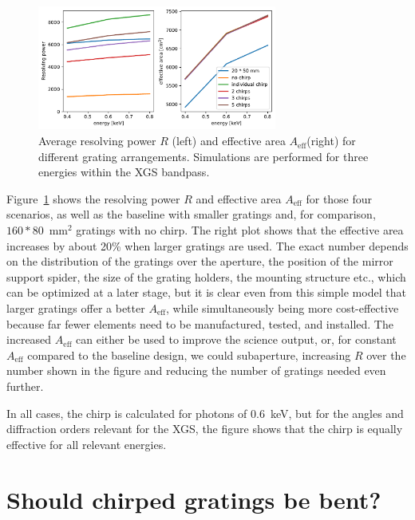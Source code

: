\documentclass[]{spie}  %
\begin{document}
\begin{figure} [ht]
\begin{center}
\includegraphics[width=0.7\textwidth]{chirp_aeff_res}
\end{center}
\caption {\label{fig:chirp_aeff_res}
Average resolving power $R$ (left) and effective area $A_{\mathrm{eff}}$(right) for different grating arrangements. Simulations are performed for three energies within the XGS bandpass. 
}
\end{figure}

Figure~\ref{fig:chirp_aeff_res} shows the resolving power $R$ and effective area $A_{\mathrm{eff}}$ for those four scenarios, as well as the baseline with smaller gratings and, for comparison, $160 * 80$~mm$^2$ gratings with no chirp. 
The right plot shows that the effective area increases by about 20\% when larger gratings are used. The exact number depends on the distribution of the gratings over the aperture, the position of the mirror support spider, the size of the grating holders, the mounting structure etc., which can be optimized at a later stage, but it is clear even from this simple model that larger gratings offer a better $A_{\mathrm{eff}}$, while simultaneously being more cost-effective because far fewer elements need to be manufactured, tested, and installed. The increased $A_{\mathrm{eff}}$ can either be used to improve the science output, or, for constant $A_{\mathrm{eff}}$ compared to the baseline design, we could subaperture, increasing $R$ over the number shown in the figure and reducing the number of gratings needed even further.

In all cases, the chirp is calculated for photons of 0.6~keV, but for the angles and diffraction orders relevant for the XGS, the figure shows that the chirp is equally effective for all relevant energies.


\section{Should chirped gratings be bent?}
\end{document}

